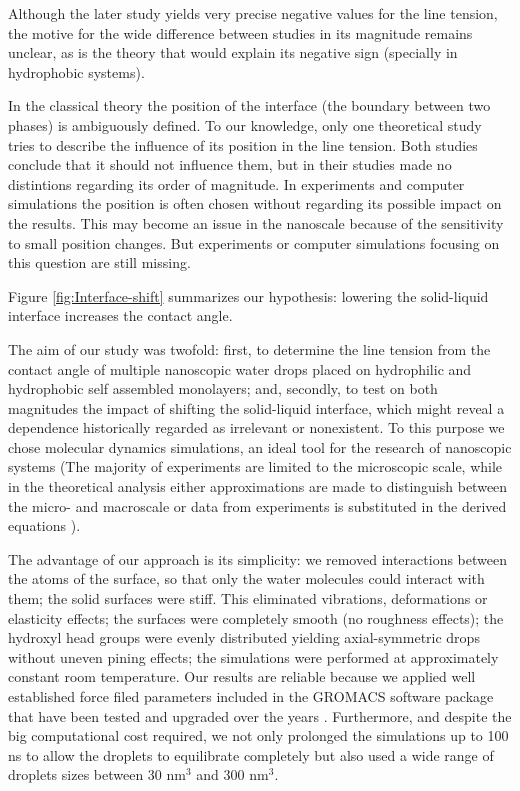 Although the later study yields very precise negative values for the
line tension, the motive for the wide difference between studies in
its magnitude remains unclear, as is the theory that would explain
its negative sign (specially in hydrophobic systems).

In the classical theory the position of the interface (the boundary
between two phases) is ambiguously defined. To our knowledge, only
one theoretical study tries to describe the influence of its position
in the line tension\cite{rusanov:2004,rusanov:2005}. Both studies
conclude that it should not influence them, but in their studies made
no distintions regarding its order of magnitude. In experiments and
computer simulations the position is often chosen without regarding
its possible impact on the results. This may become an issue in the
nanoscale because of the sensitivity to small position changes. But
experiments or computer simulations focusing on this question are
still missing.

Figure \ref{fig:Interface-shift} summarizes our hypothesis: lowering
the solid-liquid interface increases the contact angle.

The aim of our study was twofold: first, to determine the line tension
from the contact angle of multiple nanoscopic water drops placed on
hydrophilic and hydrophobic self assembled monolayers; and, secondly,
to test on both magnitudes the impact of shifting the solid-liquid
interface, which might reveal a dependence historically regarded as
irrelevant or nonexistent. To this purpose we chose molecular dynamics
simulations, an ideal tool for the research of nanoscopic systems
(The majority of experiments are limited to the microscopic scale,
while in the theoretical analysis either approximations are made to
distinguish between the micro- and macroscale or data from experiments
is substituted in the derived equations \cite{schimmele:2007,solomentsev:1999}).

The advantage of our approach is its simplicity: we removed interactions
between the atoms of the surface, so that only the water molecules
could interact with them; the solid surfaces were stiff. This eliminated
vibrations, deformations or elasticity effects; the surfaces were
completely smooth (no roughness effects); the hydroxyl head groups
were evenly distributed yielding axial-symmetric drops without uneven
pining effects; the simulations were performed at approximately constant
room temperature. Our results are reliable because we applied well
established force filed parameters included in the GROMACS software
package that have been tested and upgraded over the years \cite{oostenbrink:2004}.
Furthermore, and despite the big computational cost required, we not
only prolonged the simulations up to 100 ns to allow the droplets
to equilibrate completely but also used a wide range of droplets sizes
between 30 $\mathrm{nm^{3}}$ and 300 $\mathrm{nm^{3}}$.